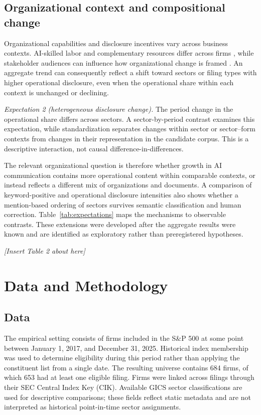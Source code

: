 \documentclass[12pt]{article}
\newcommand{\placement}[1]{%
  \begin{center}
    \vspace{0.5\baselineskip}
    \textit{[Insert #1 about here]}
    \vspace{0.5\baselineskip}
  \end{center}
}
\begin{document}
\subsection{Organizational context and compositional change}

Organizational capabilities and disclosure incentives vary across business
contexts. AI-skilled labor and complementary resources differ across firms
\citep{babina2024growth,mcelheran2024adoption}, while stakeholder audiences
can influence how organizational change is framed \citep{fiss2006symbolic}.
An aggregate trend can consequently reflect a shift toward sectors or filing
types with higher operational disclosure, even when the operational share
within each context is unchanged or declining.

\textit{Expectation 2 (heterogeneous disclosure change).} The period change
in the operational share differs across sectors. A sector-by-period contrast
examines this expectation, while standardization separates changes within
sector or sector--form contexts from changes in their representation in the
candidate corpus. This is a descriptive interaction, not causal
difference-in-differences.

The relevant organizational question is therefore whether growth in AI
communication contains more operational content within comparable contexts,
or instead reflects a different mix of organizations and documents. A
comparison of keyword-positive and operational disclosure intensities also
shows whether a mention-based ordering of sectors survives semantic
classification and human correction. Table~\ref{tab:expectations} maps the
mechanisms to observable contrasts. These extensions were developed after
the aggregate results were known and are identified as exploratory rather
than preregistered hypotheses.

\placement{Table 2}

\section{Data and Methodology}
\label{sec:methodology}

\subsection{Data}

The empirical setting consists of firms included in the S\&P 500 at some
point between January 1, 2017, and December 31, 2025. Historical index
membership was used to determine eligibility during this period rather than
applying the constituent list from a single date. The resulting universe
contains 684 firms, of which 653 had at least one eligible filing. Firms were
linked across filings through their SEC Central Index Key (CIK). Available
GICS sector classifications are used for descriptive comparisons; these
fields reflect static metadata and are not interpreted as historical
point-in-time sector assignments.
\end{document}
